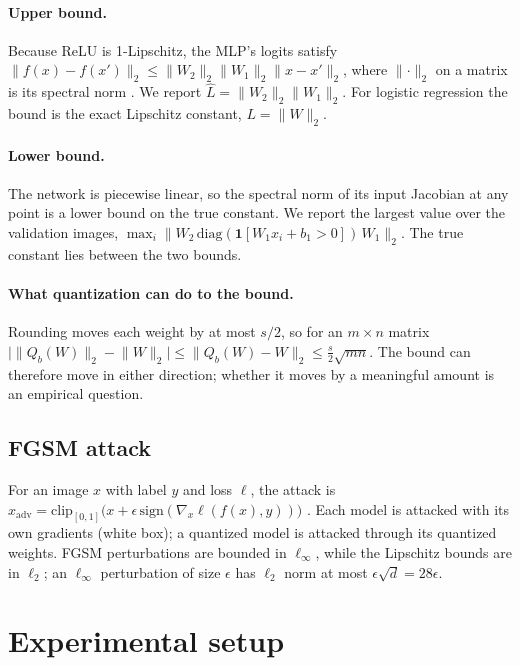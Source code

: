 \documentclass{article}
\newcommand{\norm}[1]{\lVert #1 \rVert}
\begin{document}
\paragraph{Upper bound.} Because ReLU is 1-Lipschitz, the MLP's logits satisfy $\norm{f(x) - f(x')}_2 \le \norm{W_2}_2 \norm{W_1}_2 \norm{x - x'}_2$, where $\norm{\cdot}_2$ on a matrix is its spectral norm \citep{fazlyab2019efficient}. We report $\hat{L} = \norm{W_2}_2 \norm{W_1}_2$. For logistic regression the bound is the exact Lipschitz constant, $L = \norm{W}_2$.

\paragraph{Lower bound.} The network is piecewise linear, so the spectral norm of its input Jacobian at any point is a lower bound on the true constant. We report the largest value over the validation images, $\max_i \norm{W_2\,\mathrm{diag}(\mathbf{1}[W_1 x_i + b_1 > 0])\,W_1}_2$. The true constant lies between the two bounds.

\paragraph{What quantization can do to the bound.} Rounding moves each weight by at most $s/2$, so for an $m \times n$ matrix $\bigl|\norm{Q_b(W)}_2 - \norm{W}_2\bigr| \le \norm{Q_b(W) - W}_2 \le \tfrac{s}{2}\sqrt{mn}$. The bound can therefore move in either direction; whether it moves by a meaningful amount is an empirical question.

\subsection{FGSM attack}

For an image $x$ with label $y$ and loss $\ell$, the attack is $x_{\mathrm{adv}} = \mathrm{clip}_{[0,1]}\bigl(x + \epsilon\, \mathrm{sign}(\nabla_x \ell(f(x), y))\bigr)$ \citep{goodfellow2015explaining}. Each model is attacked with its own gradients (white box); a quantized model is attacked through its quantized weights. FGSM perturbations are bounded in $\ell_\infty$, while the Lipschitz bounds are in $\ell_2$; an $\ell_\infty$ perturbation of size $\epsilon$ has $\ell_2$ norm at most $\epsilon\sqrt{d} = 28\epsilon$.

\section{Experimental setup}
\label{sec:setup}
\end{document}
